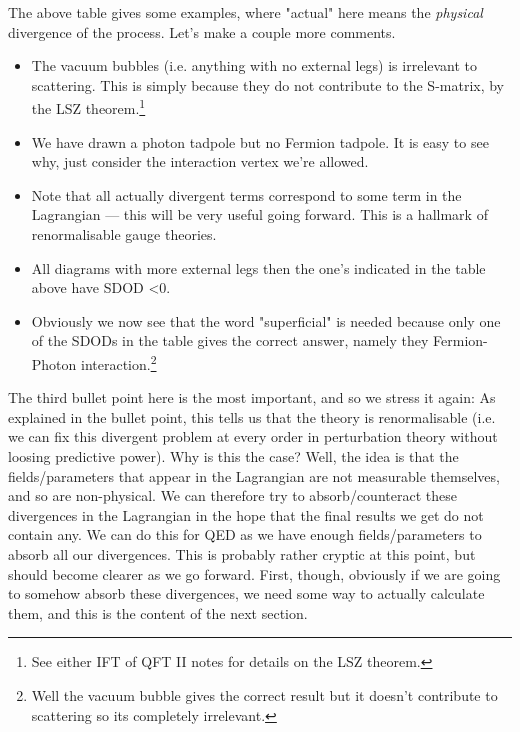 The above table gives some examples, where "actual" here means the \textit{physical} divergence of the process. Let's make a couple more comments.
\begin{itemize}
    \item The vacuum bubbles (i.e. anything with no external legs) is irrelevant to scattering. This is simply because they do not contribute to the S-matrix, by the LSZ theorem.\footnote{See either IFT of QFT II notes for details on the LSZ theorem.} 
    \item We have drawn a photon tadpole but no Fermion tadpole. It is easy to see why, just consider the interaction vertex we're allowed. 
    \item Note that all actually divergent terms correspond to some term in the Lagrangian --- this will be very useful going forward. This is a hallmark of renormalisable gauge theories.   
    \item All diagrams with more external legs then the one's indicated in the table above have SDOD <0. 
    \item Obviously we now see that the word "superficial" is needed because only one of the SDODs in the table gives the correct answer, namely they Fermion-Photon interaction.\footnote{Well the vacuum bubble gives the correct result but it doesn't contribute to scattering so its completely irrelevant.}
\end{itemize}

The third bullet point here is the most important, and so we stress it again:
\noindent As explained in the bullet point, this tells us that the theory is renormalisable (i.e. we can fix this divergent problem at every order in perturbation theory without loosing predictive power). Why is this the case? Well, the idea is that the fields/parameters that appear in the Lagrangian are not measurable themselves, and so are non-physical. We can therefore try to absorb/counteract these divergences in the Lagrangian in the hope that the final results we get do not contain any. We can do this for QED as we have enough fields/parameters to absorb all our divergences. This is probably rather cryptic at this point, but should become clearer as we go forward. First, though, obviously if we are going to somehow absorb these divergences, we need some way to actually calculate them, and this is the content of the next section. 

